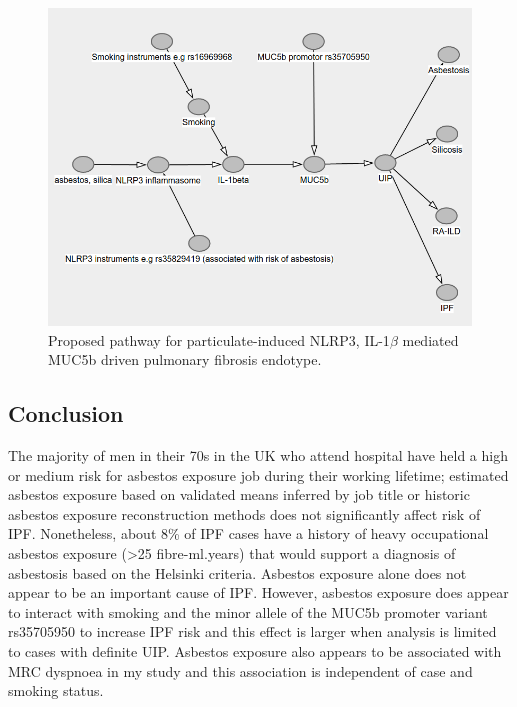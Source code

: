 \begin{figure}
\centering
\includegraphics{source/figures/possible_pathways_mr.png}
\caption{Proposed pathway for particulate-induced NLRP3,
IL-1\ensuremath{\beta} mediated MUC5b driven pulmonary fibrosis
endotype.}
\end{figure}

\hypertarget{conclusion}{%
\subsection{Conclusion}\label{conclusion}}

The majority of men in their 70s in the UK who attend hospital have held
a high or medium risk for asbestos exposure job during their working
lifetime; estimated asbestos exposure based on validated means inferred
by job title or historic asbestos exposure reconstruction methods does
not significantly affect risk of IPF. Nonetheless, about 8\% of IPF
cases have a history of heavy occupational asbestos exposure
(\textgreater25 fibre-ml.years) that would support a diagnosis of
asbestosis based on the Helsinki criteria. Asbestos exposure alone does
not appear to be an important cause of IPF. However, asbestos exposure
does appear to interact with smoking and the minor allele of the MUC5b
promoter variant rs35705950 to increase IPF risk and this effect is
larger when analysis is limited to cases with definite UIP. Asbestos
exposure also appears to be associated with MRC dyspnoea in my study and
this association is independent of case and smoking status.
